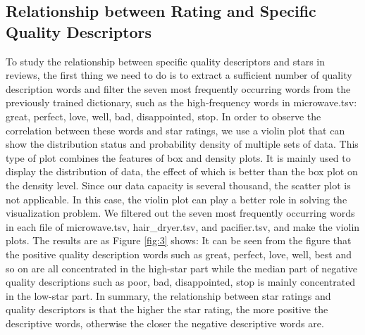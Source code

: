 \documentclass{mcmthesis}
\begin{document}
\subsection{Relationship between Rating and Specific Quality Descriptors}
To study the relationship between specific quality descriptors and stars in reviews, the first thing we need to do is to extract a sufficient number of quality description words and filter the seven most frequently occurring words from the previously trained dictionary, such as the high-frequency words in microwave.tsv: great, perfect, love, well, bad, disappointed, stop. 
In order to observe the correlation between these words and star ratings, we use a violin plot that can show the distribution status and probability density of multiple sets of data. This type of plot combines the features of box and density plots. It is mainly used to display the distribution of data, the effect of which is better than the box plot on the density level. Since our data capacity is several thousand, the scatter plot is not applicable. In this case, the violin plot can play a better role in solving the visualization problem.
We filtered out the seven most frequently occurring words in each file of microwave.tsv, hair\_dryer.tsv, and pacifier.tsv, and make the violin plots. The results are as Figure \ref{fig:3} shows:
It can be seen from the figure that the positive quality description words such as great, perfect, love, well, best and so on are all concentrated in the high-star part while the median part of negative quality descriptions such as poor, bad, disappointed, stop is mainly concentrated in the low-star part. In summary, the relationship between star ratings and quality descriptors is that the higher the star rating, the more positive the descriptive words, otherwise the closer the negative descriptive words are.
\end{document}
